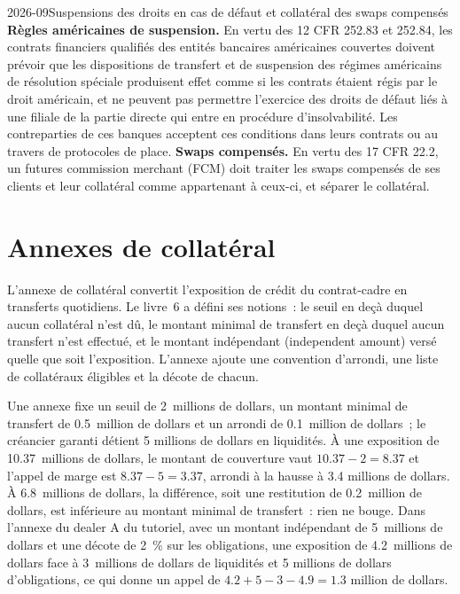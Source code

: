 \begin{dated}{2026-09}{Suspensions des droits en cas de défaut et collatéral des swaps compensés}\label{dat:fm:legal-documentation:stays}
\textbf{Règles américaines de suspension.} En vertu des 12 CFR 252.83 et 252.84, les contrats financiers qualifiés des entités bancaires américaines couvertes doivent prévoir que les
dispositions de transfert et de suspension des régimes américains de résolution spéciale produisent effet comme si les contrats étaient régis par le droit américain, et ne peuvent pas permettre l'exercice des
droits de défaut liés à une filiale de la partie directe qui entre en procédure d'insolvabilité. Les contreparties de ces banques acceptent ces
conditions dans leurs contrats ou au travers de protocoles de place. \textbf{Swaps compensés.} En vertu des 17 CFR 22.2, un futures commission merchant (FCM) doit traiter les
swaps compensés de ses clients et leur collatéral comme appartenant à ceux-ci, et séparer le collatéral.
\end{dated}

\section{Annexes de collatéral}

L'annexe de collatéral convertit l'exposition de crédit du contrat-cadre en transferts quotidiens. Le livre~6 a défini ses notions~: le seuil en deçà duquel aucun
collatéral n'est dû, le montant minimal de transfert en deçà duquel aucun transfert n'est effectué, et le montant indépendant (independent amount) versé quelle que soit l'exposition. L'annexe
ajoute une convention d'arrondi, une liste de collatéraux éligibles et la décote de chacun.

\begin{example}\label{ex:fm:legal-documentation:call}
Une annexe fixe un seuil de 2~millions de dollars, un montant minimal de transfert de 0.5~million de dollars et un arrondi de 0.1~million de dollars~; le créancier garanti détient 5
millions de dollars en liquidités. À une exposition de 10.37~millions de dollars, le montant de couverture vaut $10.37-2=8.37$ et l'appel de marge est $8.37-5=3.37$, arrondi à la hausse à 3.4
millions de dollars. À 6.8~millions de dollars, la différence, soit une restitution de 0.2~million de dollars, est inférieure au montant minimal de transfert~: rien ne bouge. Dans l'annexe du dealer A
du tutoriel, avec un montant indépendant de 5~millions de dollars et une décote de 2~\% sur les obligations, une exposition de 4.2~millions de dollars face à 3~millions de dollars de liquidités et 5
millions de dollars d'obligations, ce qui donne un appel de $4.2+5-3-4.9=1.3$ million de dollars.
\end{example}

